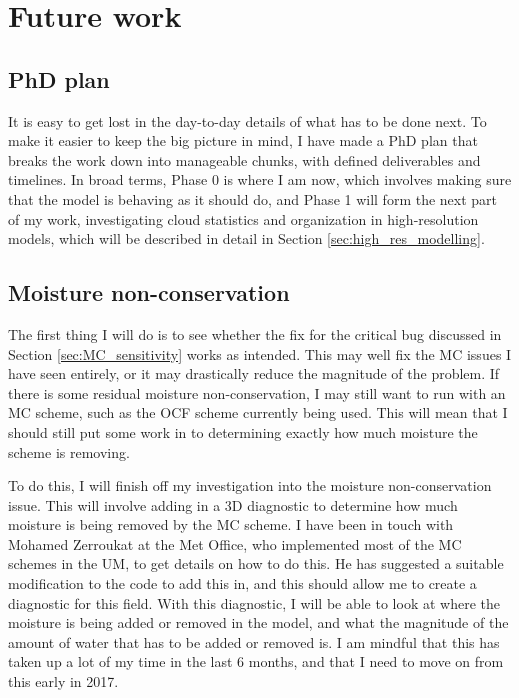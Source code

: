 \documentclass[11pt,a4paper]{article}
\begin{document}
\section{Future work}

\subsection{PhD plan}
It is easy to get lost in the day-to-day details of what has to be done next. To make it easier to keep the big picture in mind, I have made a PhD plan that breaks the work down into manageable chunks, with defined deliverables and timelines. In broad terms, Phase 0 is where I am now, which involves making sure that the model is behaving as it should do, and Phase 1 will form the next part of my work, investigating cloud statistics and organization in high-resolution models, which will be described in detail in Section 
\ref{sec:high_res_modelling}.

\subsection{Moisture non-conservation}

The first thing I will do is to see whether the fix for the critical bug discussed in Section \ref{sec:MC_sensitivity} works as intended. This may well fix the MC issues I have seen entirely, or it may drastically reduce the magnitude of the problem. If there is some residual moisture non-conservation, I may still want to run with an MC scheme, such as the OCF scheme currently being used. This will mean that I should still put some work in to determining exactly how much moisture the scheme is removing.

To do this, I will finish off my investigation into the moisture non-conservation issue. This will involve adding in a 3D diagnostic to determine how much moisture is being removed by the MC scheme. I have been in touch with Mohamed Zerroukat at the Met Office, who implemented most of the MC schemes in the UM, to get details on how to do this. He has suggested a suitable modification to the code to add this in, and this should allow me to create a diagnostic for this field. With this diagnostic, I will be able to look at where the moisture is being added or removed in the model, and what the magnitude of the amount of water that has to be added or removed is. I am mindful that this has taken up a lot of my time in the last 6 months, and that I need to move on from this early in 2017.
\end{document}
